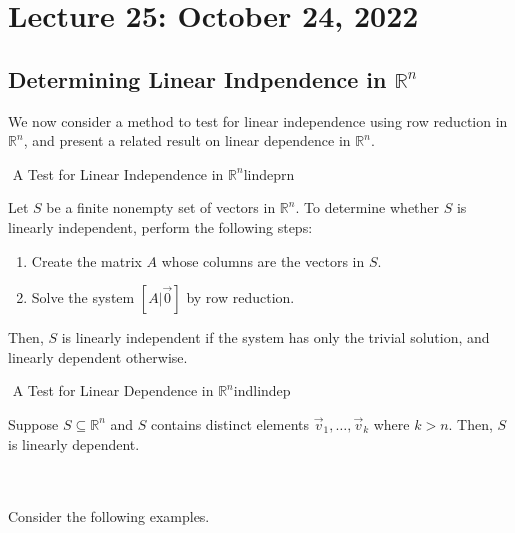 \pagebreak

    \section{Lecture 25: October 24, 2022}

        \subsection{Determining Linear Indpendence in \(\mathbb{R}^n\)}

            We now consider a method to test for linear independence using row reduction in \(\mathbb{R}^n\), and present a related result on linear dependence in \(\mathbb{R}^n\).
            \begin{theorem}{\Stop\,\,A Test for Linear Independence in \(\mathbb{R}^n\)}{lindeprn}
                
                Let \(S\) be a finite nonempty set of vectors in \(\mathbb{R}^n\). To determine whether \(S\) is linearly independent, perform the following steps:
                \begin{enumerate}
                    \item Create the matrix \(A\) whose columns are the vectors in \(S\).
                    \item Solve the system \([A|\vec{0}]\) by row reduction.
                \end{enumerate}
                Then, \(S\) is linearly independent if the system has only the trivial solution, and linearly dependent otherwise.
            \end{theorem}
            \begin{theorem}{\Stop\,\,A Test for Linear Dependence in \(\mathbb{R}^n\)}{indlindep}

                Suppose \(S\subseteq\mathbb{R}^n\) and \(S\) contains distinct elements \(\vec{v}_1,\ldots,\vec{v}_k\) where \(k>n\). Then, \(S\) is linearly dependent.
                
            \end{theorem}
            \vphantom
            \\
            \\
            Consider the following examples.
